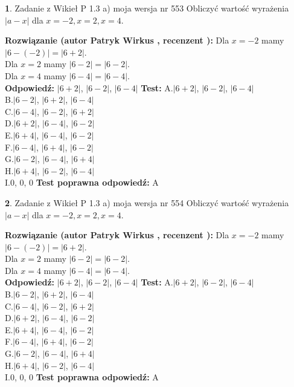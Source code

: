 \documentclass[12pt, a4paper]{article}
\theoremstyle{definition} %
\newtheorem{zad}{}
\newcommand{\zadStart}[1]{\begin{zad}#1\newline}
\newcommand{\zadStop}{\end{zad}}
\newcommand{\rozwStart}[2]{\noindent \textbf{Rozwiązanie (autor #1 , recenzent #2): }\newline}
\newcommand{\rozwStop}{\newline}
\newcommand{\odpStart}{\noindent \textbf{Odpowiedź:}\newline}
\newcommand{\odpStop}{\newline}
\newcommand{\testStart}{\noindent \textbf{Test:}\newline}
\newcommand{\testStop}{\newline}
\newcommand{\kluczStart}{\noindent \textbf{Test poprawna odpowiedź:}\newline}
\newcommand{\kluczStop}{\newline}
\begin{document}
\zadStart{Zadanie z Wikieł P 1.3 a) moja wersja nr 553}
Obliczyć wartość wyrażenia $|a - x|$ dla $x=-2,x=2,x=4$.
\zadStop
\rozwStart{Patryk Wirkus}{}
Dla $x = -2$ mamy $|6 - (-2)| = |6 + 2|$.\\
Dla $x = 2$ mamy $|6 - 2| = |6 - 2|$.\\
Dla $x = 4$ mamy $|6 - 4| = |6 - 4|$.\\
\rozwStop
\odpStart
$|6 + 2|$, $|6 - 2|$, $|6 - 4|$
\odpStop
\testStart
A.$|6 + 2|$, $|6 - 2|$, $|6 - 4|$\\
B.$|6 - 2|$, $|6 + 2|$, $|6 - 4|$\\
C.$|6 - 4|$, $|6 - 2|$, $|6 + 2|$\\
D.$|6 + 2|$, $|6 - 4|$, $|6 - 2|$\\
E.$|6 + 4|$, $|6 - 4|$, $|6 - 2|$\\
F.$|6 - 4|$, $|6 + 4|$, $|6 - 2|$\\
G.$|6 - 2|$, $|6 - 4|$, $|6 + 4|$\\
H.$|6 + 4|$, $|6 - 2|$, $|6 - 4|$\\
I.$0$, $0$, $0$
\testStop
\kluczStart
A
\kluczStop



\zadStart{Zadanie z Wikieł P 1.3 a) moja wersja nr 554}
Obliczyć wartość wyrażenia $|a - x|$ dla $x=-2,x=2,x=4$.
\zadStop
\rozwStart{Patryk Wirkus}{}
Dla $x = -2$ mamy $|6 - (-2)| = |6 + 2|$.\\
Dla $x = 2$ mamy $|6 - 2| = |6 - 2|$.\\
Dla $x = 4$ mamy $|6 - 4| = |6 - 4|$.\\
\rozwStop
\odpStart
$|6 + 2|$, $|6 - 2|$, $|6 - 4|$
\odpStop
\testStart
A.$|6 + 2|$, $|6 - 2|$, $|6 - 4|$\\
B.$|6 - 2|$, $|6 + 2|$, $|6 - 4|$\\
C.$|6 - 4|$, $|6 - 2|$, $|6 + 2|$\\
D.$|6 + 2|$, $|6 - 4|$, $|6 - 2|$\\
E.$|6 + 4|$, $|6 - 4|$, $|6 - 2|$\\
F.$|6 - 4|$, $|6 + 4|$, $|6 - 2|$\\
G.$|6 - 2|$, $|6 - 4|$, $|6 + 4|$\\
H.$|6 + 4|$, $|6 - 2|$, $|6 - 4|$\\
I.$0$, $0$, $0$
\testStop
\kluczStart
A
\kluczStop
\end{document}
